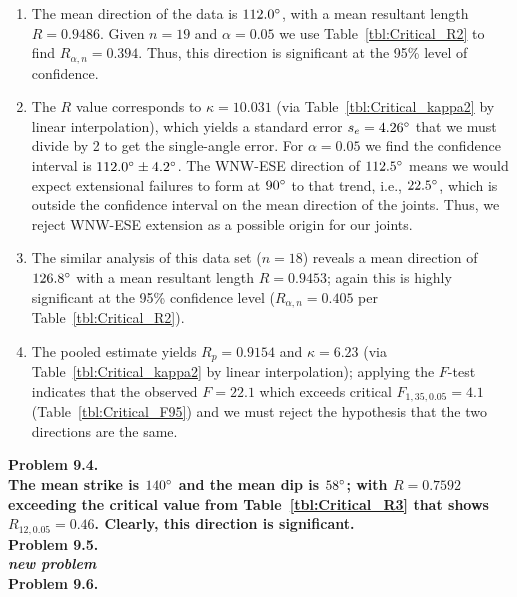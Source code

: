 \begin{enumerate}[label=\alph*)]
\item  The mean direction of the data is $112.0^{\circ}$,
with a mean resultant length $R = 0.9486$.  Given $n = 19$ and $\alpha = 0.05$ we use Table~\ref{tbl:Critical_R2}
to find $R_{\alpha,n} = 0.394$.  Thus,
this direction is significant at the 95\% level of confidence.

\item The $R$ value corresponds to $\kappa = 10.031$ (via Table~\ref{tbl:Critical_kappa2} by linear interpolation),
which yields a standard error $s_e = 4.26^{\circ}$
that we must divide by 2 to get the single-angle error.  For
$\alpha = 0.05$ we find the confidence interval is $112.0^{\circ}\pm4.2^{\circ}$. The WNW-ESE direction of $112.5^{\circ}$
means we would expect extensional failures to form at $90^{\circ}$ to that trend, i.e., $22.5^{\circ}$, which is outside
the confidence interval on the mean direction of the joints.  Thus, we reject WNW-ESE
extension as a possible origin for our joints.

\item The similar analysis of this data set ($n = 18$) reveals a mean direction of $126.8^{\circ}$ with a mean resultant
length $R = 0.9453$; again this is highly significant at the 95\% confidence level ($R_{\alpha,n} = 0.405$ per Table~\ref{tbl:Critical_R2}).

\item The pooled estimate yields $R_p = 0.9154$ and $\kappa = 6.23$ (via Table~\ref{tbl:Critical_kappa2} by linear interpolation);
applying the $F$-test
indicates that the observed $F = 22.1$ which exceeds critical $F_{1,35,0.05} = 4.1$ (Table~\ref{tbl:Critical_F95}) and
we must reject the hypothesis that the two directions are the same.

\end{enumerate}

\noindent
\bf{Problem 9.4.} \\

The mean strike is $140^{\circ}$ and the mean dip is $58^{\circ}$; with $R = 0.7592$ exceeding the
critical value from Table~\ref{tbl:Critical_R3} that shows $R_{12,0.05} = 0.46$.
Clearly, this direction is significant.
\\

\noindent
\bf{Problem 9.5.} \\

{\it new problem}\\

\noindent
\bf{Problem 9.6.} \\

